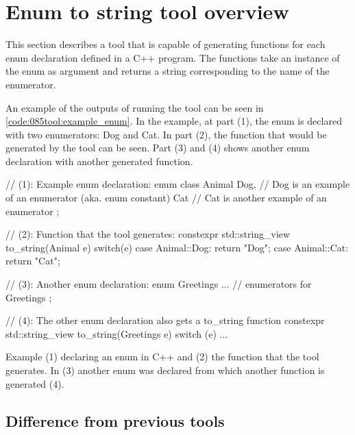 \pagebreak
\section{Enum to string tool overview}
This section describes a tool that is capable of generating  functions for each enum declaration defined in a C++ program. The  functions take an instance of the enum as argument and returns a string corresponding to the name of the enumerator.

An example of the outputs of running the tool can be seen in \cref{code:085tool:example_enum}. In the example, at part (1), the enum  is declared with two enumerators: Dog and Cat. In part (2), the  function that would be generated by the tool can be seen. Part (3) and (4) shows another enum declaration with another generated  function.

\begin{listing}[H]
    \begin{cppcode}
// (1): Example enum declaration:
enum class Animal{
    Dog, // Dog is an example of an enumerator (aka. enum constant)
    Cat // Cat is another example of an enumerator
};


// (2): Function that the tool generates:
constexpr std::string_view to_string(Animal e){
    switch(e) {
        case Animal::Dog: return "Dog";
        case Animal::Cat: return "Cat";
    }
}

// (3): Another enum declaration:
enum Greetings {
    ... // enumerators for Greetings
};

// (4): The other enum declaration also gets a to_string function
constexpr std::string_view to_string(Greetings e){
    switch (e) {
        ... 
    }
}
    \end{cppcode}
    \caption{Example (1) declaring an enum in C++ and (2) the  function that the tool generates. In (3) another enum was declared from which another  function is generated (4).}
    \label{code:085tool:example_enum}
\end{listing}

\subsection{Difference from previous tools}

